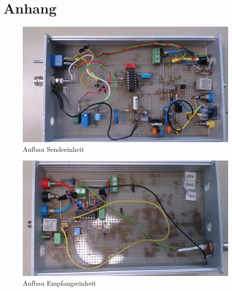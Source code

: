 \section{Anhang}
\begin{figure}[H]
	\centering
	\includegraphics[scale=0.08]{gfx/inside/tx.JPG}
	\caption{Aufbau Sendeeinheit}
\end{figure}

\begin{figure}[H]
	\centering
	\includegraphics[scale=0.08]{gfx/inside/rx.JPG}
	\caption{Aufbau Empfangseinheit}
\end{figure}



